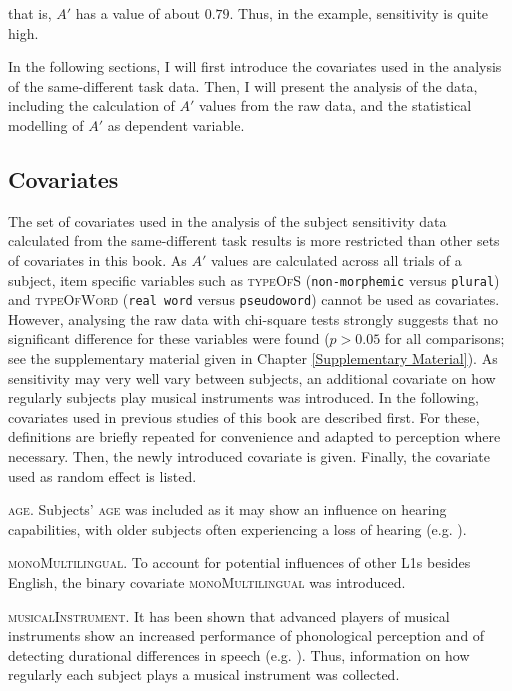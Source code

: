 \noindent that is, $A'$ has a value of about $0.79$. Thus, in the example, sensitivity is quite high.

In the following sections, I will first introduce the covariates used in the analysis of the same-different task data. Then, I will present the analysis of the data, including the calculation of $A'$ values from the raw data, and the statistical modelling of $A'$ as dependent variable.

\subsection{Covariates}\label{section06_2_1}

The set of covariates used in the analysis of the subject sensitivity data calculated from the same-different task results is more restricted than other sets of covariates in this book. As $A'$ values are calculated across all trials of a subject, item specific variables such as \textsc{typeOfS} (\texttt{non-morphemic} versus \texttt{plural}) and \textsc{typeOfWord} (\texttt{real word} versus \texttt{pseudoword}) cannot be used as covariates. However, analysing the raw data with chi-square tests strongly suggests that no significant difference for these variables were found ($p>0.05$ for all comparisons; see the supplementary material given in Chapter \ref{Supplementary Material}). As sensitivity may very well vary between subjects, an additional covariate on how regularly subjects play musical instruments was introduced. In the following, covariates used in previous studies of this book are described first. For these, definitions are briefly repeated for convenience and adapted to perception where necessary. Then, the newly introduced covariate is given. Finally, the covariate used as random effect is listed.

\textsc{age}. Subjects’ \textsc{age} was included as it may show an influence on hearing capabilities, with older subjects often experiencing a loss of hearing (e.g. \cite{Lee2013}).

\textsc{monoMultilingual}. To account for potential influences of other L1s besides English, the binary covariate \textsc{monoMultilingual} was introduced. 

\textsc{musicalInstrument}. It has been shown that advanced players of musical instruments show an increased performance of phonological perception and of detecting durational differences in speech (e.g. \cite{Anvari2002,Milovanov2009}). Thus, information on how regularly each subject plays a musical instrument was collected.

